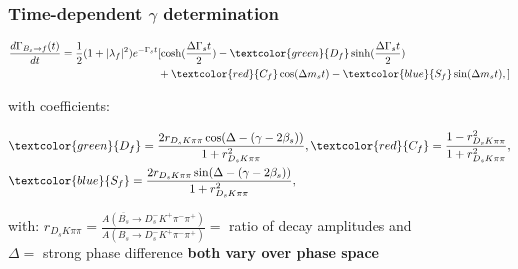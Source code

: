 \documentclass[]{beamer}
\begin{document}
\begin{frame}
\frametitle{Time-dependent $\gamma$ determination}


\begin{equation*}
\begin{split}
\frac{d\Gamma_{B_{s}\to f}(t)}{dt} = \frac{1}{2}(1+|\lambda_{f}|^{2})e^{-\Gamma_{s}t} & [\cosh(\frac{\Delta\Gamma_{s}t}{2}) - \textcolor{green}{D_{f}}\sinh(\frac{\Delta\Gamma_{s}t}{2}) \\
& + \textcolor{red}{C_{f}}\cos(\Delta m_{s}t) - \textcolor{blue}{S_{f}}\sin(\Delta m_{s}t),]
\end{split}
\end{equation*}

with coefficients:

\begin{eqnarray*}
&\textcolor{green}{D_{f}} = \frac{2r_{D_{s}K\pi\pi}\cos(\Delta-(\gamma-2\beta_{s}))}{1 + r_{D_{s}K\pi\pi}^{2}}, 
\textcolor{red}{C_{f}} = \frac{1 - r_{D_{s}K\pi\pi}^{2}}{1 + r_{D_{s}K\pi\pi}^{2}}, \\
&\textcolor{blue}{S_{f}} = \frac{2r_{D_{s}K\pi\pi}\sin(\Delta-(\gamma-2\beta_{s}))}{1 + r_{D_{s}K\pi\pi}^{2}},
\end{eqnarray*}

with: \newline
$r_{D_{s}K\pi\pi} = \frac{A(\overline{B_{s}}\to D_{s}^{-}K^{+}\pi^{-}\pi^{+})}{A(B_{s}\to D_{s}^{-}K^{+}\pi^{-}\pi^{+})} = $ ratio of decay amplitudes and \\
$\Delta = $ strong phase difference \newline
\bfseries both vary over phase space \normalfont

\end{frame}
\end{document}

